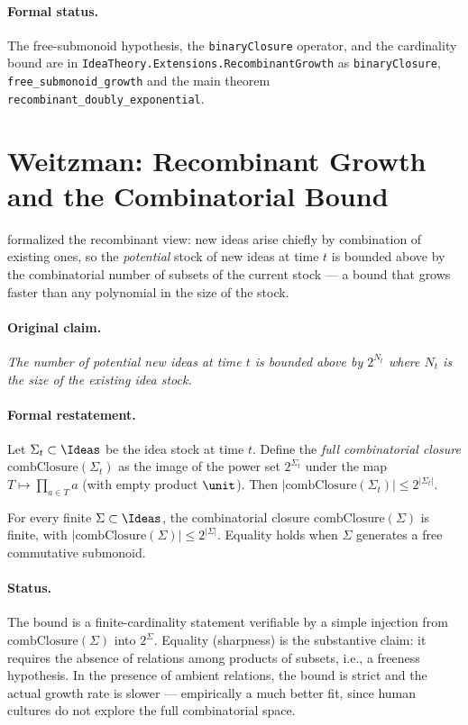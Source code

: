 \paragraph{Formal status.} The free-submonoid hypothesis, the
\texttt{binaryClosure} operator, and the cardinality bound are in
\texttt{IdeaTheory.Extensions.RecombinantGrowth} as
\texttt{binaryClosure}, \texttt{free\_submonoid\_growth} and the main
theorem \texttt{recombinant\_doubly\_exponential}.

\section{Weitzman: Recombinant Growth and the Combinatorial Bound}
\label{sec:weitzman}

\citet{Weitzman1998} formalized the recombinant view: new ideas arise
chiefly by combination of existing ones, so the \emph{potential} stock
of new ideas at time $t$ is bounded above by the combinatorial number
of subsets of the current stock — a bound that grows faster than any
polynomial in the size of the stock.

\paragraph{Original claim.} \emph{The number of potential new ideas at
time $t$ is bounded above by $2^{N_t}$ where $N_t$ is the size of the
existing idea stock.}

\paragraph{Formal restatement.} Let $\Sigma_t \subset \Ideas$ be the
idea stock at time $t$. Define the \emph{full combinatorial closure}
$\mathrm{combClosure}(\Sigma_t)$ as the image of the power set
$2^{\Sigma_t}$ under the map $T\mapsto \prod_{a\in T} a$ (with empty
product $\unit$). Then $|\mathrm{combClosure}(\Sigma_t)| \leq
2^{|\Sigma_t|}$.

\begin{theorem}
\label{thm:weitzman}
For every finite $\Sigma\subset\Ideas$, the combinatorial closure
$\mathrm{combClosure}(\Sigma)$ is finite, with
$|\mathrm{combClosure}(\Sigma)| \leq 2^{|\Sigma|}$. Equality holds when
$\Sigma$ generates a free commutative submonoid.
\end{theorem}

\paragraph{Status.} The bound is a finite-cardinality statement
verifiable by a simple injection from
$\mathrm{combClosure}(\Sigma)$ into $2^{\Sigma}$. Equality (sharpness)
is the substantive claim: it requires the absence of relations among
products of subsets, i.e., a freeness hypothesis. In the presence of
ambient relations, the bound is strict and the actual growth rate is
slower — empirically a much better fit, since human cultures do not
explore the full combinatorial space.

